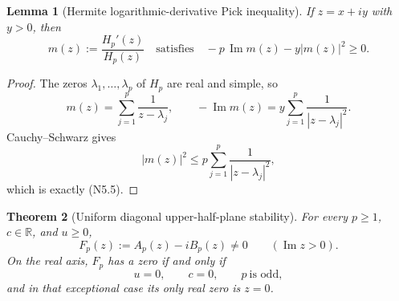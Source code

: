\documentclass[11pt]{article}
\newtheorem{theorem}{Theorem}[section]
\newtheorem{lemma}[theorem]{Lemma}
\theoremstyle{definition}
\theoremstyle{remark}
\newcommand{\abs}[1]{\left\lvert #1\right\rvert}
\begin{document}
\begin{lemma}[Hermite logarithmic-derivative Pick inequality]
\label{lem:f2v5-pick}
If \(z=x+iy\) with \(y>0\), then
\[
 m(z):=\frac{H_p'(z)}{H_p(z)}
 \quad\text{satisfies}\quad
 -p\,\operatorname{Im}m(z)-y\abs{m(z)}^2\ge0.
 \tag{N5.5}
\]
\end{lemma}

\begin{proof}
The zeros \(\lambda_1,\ldots,\lambda_p\) of \(H_p\) are real and simple,
so
\[
 m(z)=\sum_{j=1}^p\frac1{z-\lambda_j},\qquad
 -\operatorname{Im}m(z)
 =y\sum_{j=1}^p\frac1{\abs{z-\lambda_j}^2}.
 \tag{N5.6}
\]
Cauchy--Schwarz gives
\[
 \abs{m(z)}^2
 \le p\sum_{j=1}^p\frac1{\abs{z-\lambda_j}^2},
 \tag{N5.7}
\]
which is exactly \textup{(N5.5)}.
\end{proof}

\begin{theorem}[Uniform diagonal upper-half-plane stability]
\label{thm:f2v5-diagonal}
For every \(p\ge1\), \(c\in\mathbb R\), and \(u\ge0\),
\[
 F_p(z):=A_p(z)-iB_p(z)\ne0
 \qquad(\operatorname{Im}z>0).
 \tag{N5.8}
\]
On the real axis, \(F_p\) has a zero if and only if
\[
 u=0,\qquad c=0,\qquad p\ \text{is odd},
 \tag{N5.9}
\]
and in that exceptional case its only real zero is \(z=0\).
\end{theorem}
\end{document}
